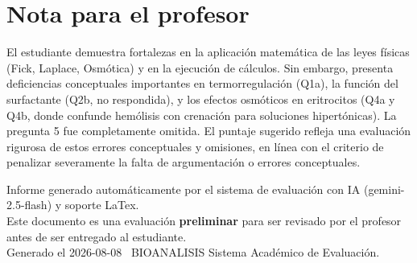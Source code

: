 \documentclass[11pt,a4paper]{article}
\begin{document}
\section*{Nota para el profesor}
\begin{tcolorbox}[
  enhanced, breakable,
  colback=yellow!8, colframe=yellow!60!black,
  fonttitle=\bfseries, coltitle=black,
  title={Observaciones para revisión manual},
  top=4pt, bottom=4pt, left=8pt, right=8pt,
]
El estudiante demuestra fortalezas en la aplicación matemática de las leyes físicas (Fick, Laplace, Osmótica) y en la ejecución de cálculos. Sin embargo, presenta deficiencias conceptuales importantes en termorregulación (Q1a), la función del surfactante (Q2b, no respondida), y los efectos osmóticos en eritrocitos (Q4a y Q4b, donde confunde hemólisis con crenación para soluciones hipertónicas). La pregunta 5 fue completamente omitida. El puntaje sugerido refleja una evaluación rigurosa de estos errores conceptuales y omisiones, en línea con el criterio de penalizar severamente la falta de argumentación o errores conceptuales.
\end{tcolorbox}

\vspace{12pt}
\begin{center}
  \footnotesize\color{gray}
  Informe generado automáticamente por el sistema de evaluación con IA (gemini-2.5-flash) y soporte LaTex. \\
  Este documento es una evaluación \textbf{preliminar} para ser revisado por el profesor antes de ser entregado al 
  estudiante. \\
  Generado el 2026-08-08 \textbullet\ BIOANALISIS Sistema Académico de Evaluación.
  \end{center}
\end{document}

